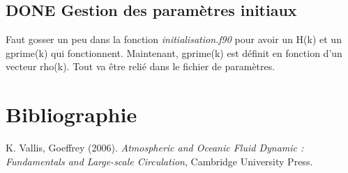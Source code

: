 \documentclass{article}
\numberwithin{equation}{section}
\begin{document}
\subsection{{\bfseries\sffamily DONE} Gestion des paramètres initiaux}
\label{sec:org80f4840}
Faut gosser un peu dans la fonction \emph{initialisation.f90} pour avoir un H(k) et un gprime(k) qui fonctionnent.
Maintenant, gprime(k) est définit en fonction d'un vecteur rho(k). 
Tout va être relié dans le fichier de paramètres.

\section{Bibliographie}
\label{sec:org0fcdab9}

\noindent
K. Vallis, Goeffrey (2006). \emph{Atmospheric and Oceanic Fluid Dynamic : Fundamentals and Large-scale Circulation}, Cambridge University Press.
\end{document}
